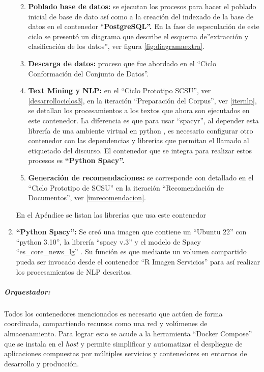 \documentclass[
  12pt,
  openany]{book}
\providecommand{\tightlist}{%
  \setlength{\itemsep}{0pt}\setlength{\parskip}{0pt}}
\begin{document}
\begin{enumerate}
  \begin{enumerate}
  \def\labelenumii{\arabic{enumii}.}
  \tightlist
  \item
    \textbf{Poblado base de datos:} se ejecutan los procesos para hacer el poblado inicial de base de dato así como a la creación del indexado de la base de datos en el contenedor ``\textbf{PostgreSQL''.} En la fase de especulación de este ciclo se presentó un diagrama que describe el esquema de''extracción y clasificación de los datos'', ver figura \ref{fig:diagramaextra}.
  \item
    \textbf{Descarga de datos:} proceso que fue abordado en el ``Ciclo Conformación del Conjunto de Datos''.
  \item
    \textbf{Text Mining y NLP:} en el ``Ciclo Prototipo SCSU'', ver \ref{desarrollociclos3}, en la iteración ``Preparación del Corpus'', ver \ref{iternlp}, se detallan los procesamientos a los textos que ahora son ejecutados en este contenedor. La diferencia es que para usar ``spacyr'', al depender esta librería de una ambiente virtual en python , es necesario configurar otro contenedor con las dependencias y librerías que permitan el llamado al etiquetado del discurso. El contenedor que se integra para realizar estos procesos es \textbf{``Python Spacy''.}
  \item
    \textbf{Generación de recomendaciones:} se corresponde con detallado en el ``Ciclo Prototipo de SCSU'' en la iteración ``Recomendación de Documentos'', ver \ref{imrecomendacion}.
  \end{enumerate}

  En el Apéndice se listan las librerías que usa este contenedor
\item
  \textbf{``Python Spacy'':} Se creó una imagen que contiene un ``Ubuntu 22'' con ``python 3.10'', la librería ``spacy v.3'' y el modelo de Spacy ``es\_core\_news\_lg'' . Su función es que mediante un volumen compartido pueda ser invocado desde el contenedor ``R Imagen Servicios'' para así realizar los procesamientos de NLP descritos.
\end{enumerate}

\hypertarget{orquestador-1}{%
\subparagraph{Orquestador:}\label{orquestador-1}}

Todos los contenedores mencionados es necesario que actúen de forma coordinada, compartiendo recursos como una red y volúmenes de almacenamiento. Para lograr esto se acude a la herramienta ``Docker Compose'' que se instala en el \emph{host} y permite simplificar y automatizar el despliegue de aplicaciones compuestas por múltiples servicios y contenedores en entornos de desarrollo y producción.
\end{document}

